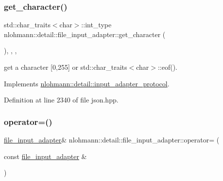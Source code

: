 \subsubsection{\texorpdfstring{get\_character()}{get\_character()}}
{\footnotesize\ttfamily std\+::char\+\_\+traits$<$char$>$\+::int\+\_\+type nlohmann\+::detail\+::file\+\_\+input\+\_\+adapter\+::get\+\_\+character (\begin{DoxyParamCaption}{ }\end{DoxyParamCaption})\hspace{0.3cm}{\ttfamily [inline]}, {\ttfamily [override]}, {\ttfamily [virtual]}, {\ttfamily [noexcept]}}



get a character \mbox{[}0,255\mbox{]} or std\+::char\+\_\+traits$<$char$>$\+::eof(). 



Implements \mbox{\hyperlink{structnlohmann_1_1detail_1_1input__adapter__protocol_aac10a6a4048a8ce8e2ed50277692a3ca}{nlohmann\+::detail\+::input\+\_\+adapter\+\_\+protocol}}.



Definition at line 2340 of file json.\+hpp.

\mbox{\label{classnlohmann_1_1detail_1_1file__input__adapter_ad59bbc7e3f23dd74475c5cb818784e42}} 
\subsubsection{\texorpdfstring{operator=()}{operator=()}\hspace{0.1cm}{\footnotesize\ttfamily [1/2]}}
{\footnotesize\ttfamily \mbox{\hyperlink{classnlohmann_1_1detail_1_1file__input__adapter}{file\+\_\+input\+\_\+adapter}}\& nlohmann\+::detail\+::file\+\_\+input\+\_\+adapter\+::operator= (\begin{DoxyParamCaption}\item[{const \mbox{\hyperlink{classnlohmann_1_1detail_1_1file__input__adapter}{file\+\_\+input\+\_\+adapter}} \&}]{ }\end{DoxyParamCaption})\hspace{0.3cm}{\ttfamily [delete]}}

\mbox{\label{classnlohmann_1_1detail_1_1file__input__adapter_a95adaec9a8c583a46083c4c493981e77}} 
